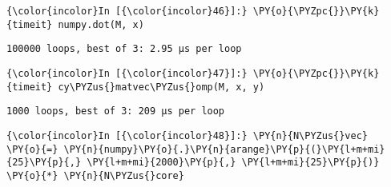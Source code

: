     \begin{Verbatim}[commandchars=\\\{\}]
{\color{incolor}In [{\color{incolor}46}]:} \PY{o}{\PYZpc{}}\PY{k}{timeit} numpy.dot(M, x)
\end{Verbatim}

    \begin{Verbatim}[commandchars=\\\{\}]
100000 loops, best of 3: 2.95 µs per loop

    \end{Verbatim}

    \begin{Verbatim}[commandchars=\\\{\}]
{\color{incolor}In [{\color{incolor}47}]:} \PY{o}{\PYZpc{}}\PY{k}{timeit} cy\PYZus{}matvec\PYZus{}omp(M, x, y)
\end{Verbatim}

    \begin{Verbatim}[commandchars=\\\{\}]
1000 loops, best of 3: 209 µs per loop

    \end{Verbatim}



    \begin{Verbatim}[commandchars=\\\{\}]
{\color{incolor}In [{\color{incolor}48}]:} \PY{n}{N\PYZus{}vec}  \PY{o}{=} \PY{n}{numpy}\PY{o}{.}\PY{n}{arange}\PY{p}{(}\PY{l+m+mi}{25}\PY{p}{,} \PY{l+m+mi}{2000}\PY{p}{,} \PY{l+m+mi}{25}\PY{p}{)} \PY{o}{*} \PY{n}{N\PYZus{}core}
\end{Verbatim}

